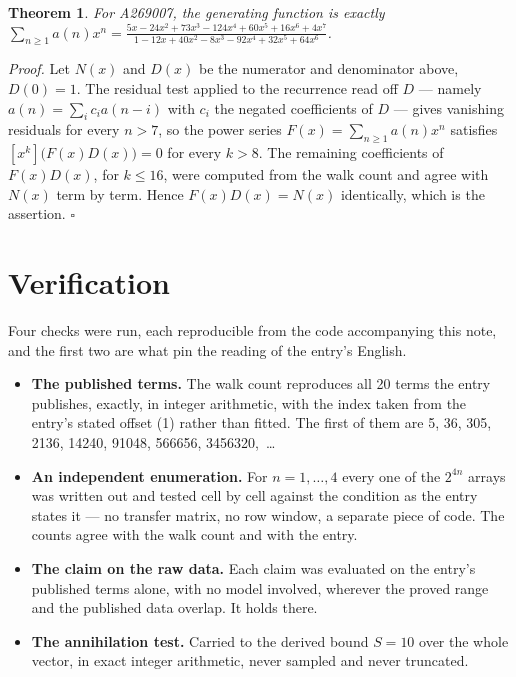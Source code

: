 \documentclass[11pt]{article}
\newtheorem{theorem}{Theorem}
\theoremstyle{definition}
\begin{document}
\begin{theorem} For A269007, the generating function is exactly $\sum_{n\ge 1} a(n)x^n = \frac{5x - 24x^{2} + 73x^{3} - 124x^{4} + 60x^{5} + 16x^{6} + 4x^{7}}{1 - 12x + 40x^{2} - 8x^{3} - 92x^{4} + 32x^{5} + 64x^{6}}$.\end{theorem}

{\itshape Proof.} Let $N(x)$ and $D(x)$ be the numerator and denominator above, $D(0)=1$. The residual test applied to the recurrence read off $D$ --- namely $a(n) = \sum_i c_i a(n-i)$ with $c_i$ the negated coefficients of $D$ --- gives vanishing residuals for every $n > 7$, so the power series $F(x)=\sum_{n\ge 1}a(n)x^n$ satisfies $[x^k]\bigl(F(x)D(x)\bigr) = 0$ for every $k > 8$. The remaining coefficients of $F(x)D(x)$, for $k \le 16$, were computed from the walk count and agree with $N(x)$ term by term. Hence $F(x)D(x) = N(x)$ identically, which is the assertion. $\square$

\section{Verification}

Four checks were run, each reproducible from the code accompanying this note, and the first two are what pin the reading of the entry's English.

\begin{itemize}

\item {\bfseries The published terms.} The walk count reproduces all 20 terms the entry publishes, exactly, in integer arithmetic, with the index taken from the entry's stated offset (1) rather than fitted. The first of them are 5, 36, 305, 2136, 14240, 91048, 566656, 3456320,~\dots

\item {\bfseries An independent enumeration.} For $n = 1,\dots,4$ every one of the $2^{4n}$ arrays was written out and tested cell by cell against the condition as the entry states it --- no transfer matrix, no row window, a separate piece of code. The counts agree with the walk count and with the entry.

\item {\bfseries The claim on the raw data.} Each claim was evaluated on the entry's published terms alone, with no model involved, wherever the proved range and the published data overlap. It holds there.

\item {\bfseries The annihilation test.} Carried to the derived bound $S = 10$ over the whole vector, in exact integer arithmetic, never sampled and never truncated.

\end{itemize}
\end{document}
